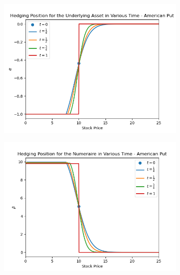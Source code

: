 \documentclass[12pt]{article}
\begin{document}
\begin{figure}[H]
  \centering
  \begin{subfigure}{.5\textwidth}
    \centering
    \includegraphics[width=\linewidth]{3a-ii-ap-alpha.png}
  \end{subfigure}%
  \begin{subfigure}{.5\textwidth}
    \centering
    \includegraphics[width=\linewidth]{3a-ii-ap-beta.png}
  \end{subfigure}%


\end{figure}
\end{document}
